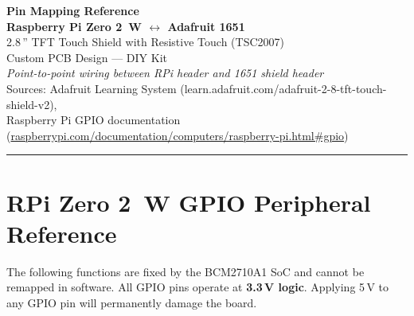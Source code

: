 \documentclass[11pt,a4paper]{article}
\begin{document}
\begin{center}
  {\LARGE\bfseries\color{hdr}
    Pin Mapping Reference\\[4pt]
    Raspberry Pi Zero 2~W $\leftrightarrow$ Adafruit 1651}\\[6pt]
  {\large 2.8\,'' TFT Touch Shield with Resistive Touch (TSC2007)}\\[4pt]
  {\normalsize Custom PCB Design --- DIY Kit\\
   \textit{Point-to-point wiring between RPi header and 1651 shield header}}\\[2pt]
  {\small\color{gray}
    Sources: Adafruit Learning System (learn.adafruit.com/adafruit-2-8-tft-touch-shield-v2),\\
    Raspberry Pi GPIO documentation
    (\href{https://www.raspberrypi.com/documentation/computers/raspberry-pi.html\#gpio}%
    {raspberrypi.com/documentation/computers/raspberry-pi.html\#gpio})}
\end{center}

\vspace{4pt}\hrule\vspace{10pt}

\section{RPi Zero 2~W GPIO Peripheral Reference}

The following functions are fixed by the BCM2710A1 SoC and cannot be
remapped in software.  All GPIO pins operate at \textbf{3.3\,V logic}.
Applying 5\,V to any GPIO pin will permanently damage the board.
\end{document}
